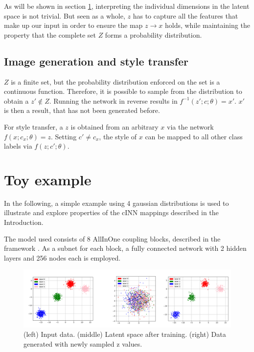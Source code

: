 \documentclass[final]{cvpr}
\begin{document}
As will be shown in section \ref{toy}, interpreting the individual dimensions in the latent space is not trivial. But seen as a whole, $z$ has to capture all the features that make up our input in order to ensure the map $z \rightarrow x $ holds, while maintaining the property that the complete set $Z$ forms a probability distribution. 

\subsection{Image generation and style transfer}
$Z$ is a finite set, but the probability distribution enforced on the set is a continuous function. Therefore, it is possible to sample from the distribution to obtain a $z' \notin Z$. Running the network in reverse results in $f^{-1}(z';c;\theta) = x'$. $x'$ is then a result, that has not been generated before. 

For style transfer, a $z$ is obtained from an arbitrary $x$ via the network $f(x;c_x;\theta) = z$. Setting $c' \neq c_x$, the style of $x$ can be mapped to all other class labels via $f(z;c';\theta)$.

\section{Toy example}\label{toy}
In the following, a simple example using 4 gaussian distributions is used to illustrate and explore properties of the cINN mappings described in the Introduction.

The model used consists of 8 AllInOne coupling blocks, described in the framework \cite{freia}. As a subnet for each block, a fully connected network with 2 hidden layers and 256 nodes each is employed.

\begin{figure}[t]
	\begin{center}
		\includegraphics[width=1.0\linewidth]{./figs/toy/no_style/combined.png}
	\end{center}
	\caption{(left) Input data. (middle) Latent space after training. (right) Data generated with newly sampled z values.}
	\label{fig:toy_generation}
\end{figure}
\end{document}
